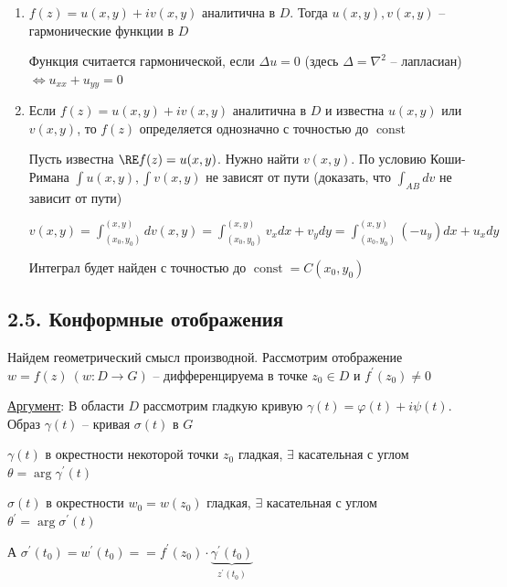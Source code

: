 \documentclass[12pt]{article}
\begin{document}
\begin{enumerate}[label=\arabic*$^\circ$]
    \item $f(z) = u(x, y) + i v(x, y)$ аналитична в $D$. Тогда $u(x, y), v(x, y)$ -- гармонические функции в $D$

    \begin{MyProof}
        Функция считается гармонической, если $\Delta u = 0$ (здесь $\Delta = \nabla^2$ -- лапласиан) $\Longleftrightarrow u_{xx} + u_{yy} = 0$
        
        \Lab
    \end{MyProof}

    \item Если $f(z) = u(x, y) + i v(x, y)$ аналитична в $D$ и известна $u(x, y)$ или $v(x, y)$, то $f(z)$ определяется однозначно с точностью до $\operatorname{const}$

    \begin{MyProof}
        Пусть известна $\RE f(z) = u(x, y)$. Нужно найти $v(x, y)$. По условию Коши-Римана $\int u(x, y), \int v(x, y)$ не зависят от пути
        (\Lab доказать, что $\int_{AB} dv$ не зависит от пути)

        $v(x, y) = \int_{(x_0, y_0)}^{(x, y)} dv(x, y) = \int_{(x_0, y_0)}^{(x, y)} v_x dx + v_y dy = \int_{(x_0, y_0)}^{(x, y)} (-u_y) dx + u_x dy$

        Интеграл будет найден с точностью до $\operatorname{const} = C(x_0, y_0)$
    \end{MyProof}

\end{enumerate}


\subsection{2.5. Конформные отображения}

Найдем геометрический смысл производной. Рассмотрим отображение $w = f(z) \ (w : D \longrightarrow G)$ -- дифференцируема в точке $z_0 \in D$ и $f^\prime(z_0) \neq 0$

\underline{Аргумент}: В области $D$ рассмотрим гладкую кривую $\gamma(t) = \varphi(t) + i\psi(t)$. Образ $\gamma(t)$ -- кривая $\sigma(t)$ в $G$

$\gamma(t)$ в окрестности некоторой точки $z_0$ гладкая, $\exists$ касательная с углом $\theta = \arg \gamma^\prime(t)$

$\sigma(t)$ в окрестности $w_0 = w(z_0)$ гладкая, $\exists$ касательная с углом $\theta^\prime = \arg \sigma^\prime(t)$

А $\sigma^\prime(t_0) = w^\prime (t_0) = =f^\prime(z_0) \cdot \underset{z^\prime(t_0)}{\underbrace{\gamma^\prime(t_0)}}$
\end{document}
